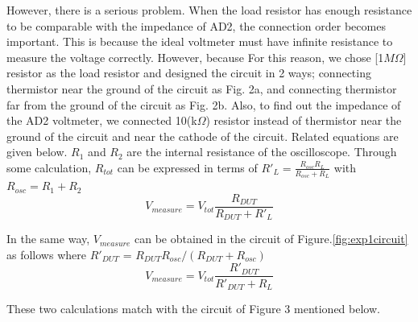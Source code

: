 \documentclass[5p,sort&compress]{elsarticle}
\begin{document}
However, there is a serious problem. When the load resistor has enough resistance to be comparable with the impedance of AD2, the connection order becomes important. This is because the ideal voltmeter must have infinite resistance to measure the voltage correctly. However, because  For this reason, we chose [1$M\Omega$] resistor as the load resistor and designed the circuit in 2 ways; connecting thermistor near the ground of the circuit as Fig. 2a, and connecting thermistor far from the ground of the circuit as Fig. 2b. 
Also, to find out the impedance of the AD2 voltmeter, we connected 10(k$\Omega$) resistor instead of thermistor near the ground of the circuit and near the cathode of the circuit. Related equations are given below. $R_{1}$ and $R_{2}$ are the internal resistance of the oscilloscope. Through some calculation, $R_{tot}$ can be expressed in terms of ${R'}_{L} = \frac{R_{osc}R_{L}}{R_{osc}+R_L}$ with $R_{osc} = R_1 + R_2$
\begin{equation}\label{eq:Impedance}
    V_{measure} = V_{tot}\frac{R_{DUT}}{R_{DUT}+R'_L}
\end{equation}

In the same way, $V_{measure}$ can be obtained in the circuit of Figure.\ref{fig:exp1circuit} as follows where $R'_{DUT}$ = $R_{DUT}R_{osc}/(R_{DUT}+R_{osc})$
\begin{equation}\label{eq:Impedance_R_DUT}
    V_{measure} = V_{tot}\frac{R'_{DUT}}{R'_{DUT}+R_L}
\end{equation}

These two calculations match with the circuit of Figure 3 mentioned below.
\end{document}

